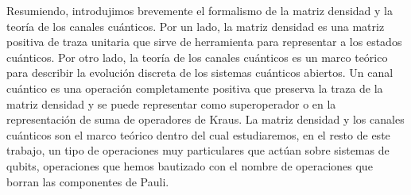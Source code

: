 Resumiendo, introdujimos brevemente 
el formalismo de la matriz densidad
y la teoría de los canales cuánticos. Por un lado, la matriz densidad es una 
matriz positiva de traza unitaria que sirve de herramienta para 
representar a los estados cuánticos. 
Por otro lado, la teoría de los canales cuánticos es un marco teórico 
para describir la evolución discreta de los sistemas cuánticos abiertos. 
Un canal cuántico es una operación completamente positiva que 
preserva la traza de la matriz densidad y se puede representar 
como superoperador o en la representación de 
suma de operadores de Kraus. La matriz densidad y los canales 
cuánticos son el marco teórico dentro del cual estudiaremos, en 
el resto de este trabajo, un tipo de operaciones muy particulares 
que actúan sobre sistemas de qubits, operaciones que hemos bautizado 
con el nombre de operaciones que borran las componentes de Pauli.


